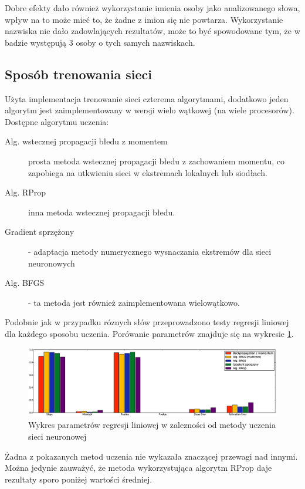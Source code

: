 \documentclass[a4paper]{article}
\begin{document}
Dobre efekty dało również wykorzystanie imienia osoby jako analizowanego słowa,
wpływ na to może mieć to, że żadne z imion się nie powtarza. Wykorzystanie
nazwiska nie dało zadowlających rezultatów, może to być spowodowane tym, że w
badzie występują 3 osoby o tych samych nazwiskach.

\subsection{Sposób trenowania sieci}

Użyta implementacja trenowanie sieci czterema algorytmami, dodatkowo jeden
algorytm jest zaimplementowany w wersji wielo wątkowej (na wiele procesorów).
Dostępne algorytmu uczenia:
\begin{description}
    \item[Alg. wstecznej propagacji błedu z momentem] prosta metoda wstecznej
        propagacji błedu z zachowaniem momentu, co zapobiega na utkwieniu sieci
        w ekstremach lokalnych lub siodłach.
    \item[Alg. RProp] inna metoda wstecznej propagacji błedu.
    \item[Gradient sprzężony] - adaptacja metody numerycznego wysnaczania
        ekstremów dla sieci neuronowych
    \item[Alg. BFGS] - ta metoda jest również zaimplementowana wielowątkowo.

\end{description}
Podobnie jak w przypadku róznych słów przeprowadzono testy regresji liniowej
dla każdego sposobu uczenia. Porówanie parametrów znajduje się na wykresie
\ref{fig:train}.


\begin{figure}[h!]
    \includegraphics[width=\textwidth]{training_network_reggresion}
    \caption{Wykres parametrów regresji liniowej w zalezności od metody uczenia
    sieci neuronowej}
    \label{fig:train}
\end{figure}

Żadna z pokazanych metod uczenia nie wykazała znaczącej przewagi nad innymi.
Można jedynie zauważyć, że metoda wykorzystująca algorytm RProp daje rezultaty
sporo poniżej wartości średniej.
\end{document}
